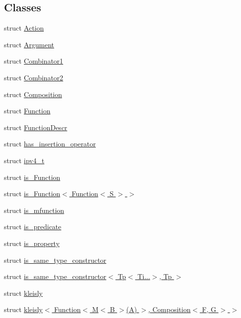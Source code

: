 \subsection*{Classes}
\begin{DoxyCompactItemize}
\item 
struct \hyperlink{structpfq_1_1lang_1_1Action}{Action}
\item 
struct \hyperlink{structpfq_1_1lang_1_1Argument}{Argument}
\item 
struct \hyperlink{structpfq_1_1lang_1_1Combinator1}{Combinator1}
\item 
struct \hyperlink{structpfq_1_1lang_1_1Combinator2}{Combinator2}
\item 
struct \hyperlink{structpfq_1_1lang_1_1Composition}{Composition}
\item 
struct \hyperlink{structpfq_1_1lang_1_1Function}{Function}
\item 
struct \hyperlink{structpfq_1_1lang_1_1FunctionDescr}{Function\+Descr}
\item 
struct \hyperlink{structpfq_1_1lang_1_1has__insertion__operator}{has\+\_\+insertion\+\_\+operator}
\item 
struct \hyperlink{structpfq_1_1lang_1_1ipv4__t}{ipv4\+\_\+t}
\item 
struct \hyperlink{structpfq_1_1lang_1_1is__Function}{is\+\_\+\+Function}
\item 
struct \hyperlink{structpfq_1_1lang_1_1is__Function_3_01Function_3_01S_01_4_01_4}{is\+\_\+\+Function$<$ Function$<$ S $>$ $>$}
\item 
struct \hyperlink{structpfq_1_1lang_1_1is__mfunction}{is\+\_\+mfunction}
\item 
struct \hyperlink{structpfq_1_1lang_1_1is__predicate}{is\+\_\+predicate}
\item 
struct \hyperlink{structpfq_1_1lang_1_1is__property}{is\+\_\+property}
\item 
struct \hyperlink{structpfq_1_1lang_1_1is__same__type__constructor}{is\+\_\+same\+\_\+type\+\_\+constructor}
\item 
struct \hyperlink{structpfq_1_1lang_1_1is__same__type__constructor_3_01Tp_3_01Ti_8_8_8_4_00_01Tp_01_4}{is\+\_\+same\+\_\+type\+\_\+constructor$<$ Tp$<$ Ti...$>$, Tp $>$}
\item 
struct \hyperlink{structpfq_1_1lang_1_1kleisly}{kleisly}
\item 
struct \hyperlink{structpfq_1_1lang_1_1kleisly_3_01Function_3_01M_3_01B_01_4_07A_08_01_4_00_01Composition_3_01F_00_01G_01_4_01_4}{kleisly$<$ Function$<$ M$<$ B $>$(\+A) $>$, Composition$<$ F, G $>$ $>$}

\end{DoxyCompactItemize}

